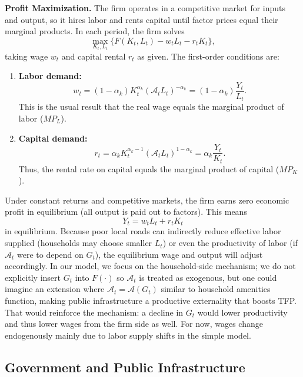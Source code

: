 {\bf Profit Maximization.}
The firm operates in a competitive market for inputs and output, so it hires labor and rents capital until factor prices equal their marginal products. In each period, the firm solves
\begin{equation}
\max_{K_t,L_t} \bigl\{F(K_t,L_t) - w_t L_t - r_t K_t\bigr\},
\end{equation}
taking wage $w_t$ and capital rental $r_t$ as given. The first-order conditions are:
\begin{enumerate}
    \item \textbf{Labor demand:}
        \begin{equation}
        w_t = (1-\alpha_k)K_t^{\alpha_k}(\mathcal{A}_t L_t)^{-\alpha_k} = (1-\alpha_k)\frac{Y_t}{L_t}.
        \end{equation}
        This is the usual result that the real wage equals the marginal product of labor ($MP_L$).
    \item \textbf{Capital demand:}
        \begin{equation}
        r_t = \alpha_k K_t^{\alpha_k-1}(\mathcal{A}_t L_t)^{1-\alpha_k} = \alpha_k\frac{Y_t}{K_t}.
        \end{equation}
        Thus, the rental rate on capital equals the marginal product of capital ($MP_K$).
\end{enumerate}
Under constant returns and competitive markets, the firm earns zero economic profit in equilibrium (all output is paid out to factors). This means
\begin{equation}
Y_t = w_t L_t + r_t K_t
\end{equation}
in equilibrium. Because poor local roads can indirectly reduce effective labor supplied (households may choose smaller $L_t$) or even the productivity of labor (if $\mathcal{A}_t$ were to depend on $G_t$), the equilibrium wage and output will adjust accordingly. In our model, we focus on the household-side mechanism; we do not explicitly insert $G_t$ into $F(\cdot)$ so $\mathcal{A}_t$ is treated as exogenous, but one could imagine an extension where $\mathcal{A}_t = \mathcal{A}(G_t)$ similar to household amenities function, making public infrastructure a productive externality that boosts TFP. That would reinforce the mechanism: a decline in $G_t$ would lower productivity and thus lower wages from the firm side as well. For now, wages change endogenously mainly due to labor supply shifts in the simple model.

\subsection{Government and Public Infrastructure}

